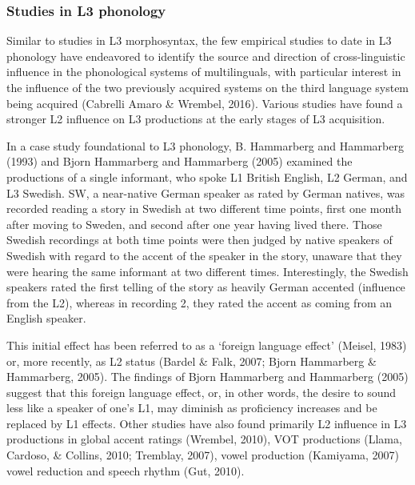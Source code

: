 \documentclass[
  man]{apa6}
\begin{document}
\hypertarget{studies-in-l3-phonology}{%
\subsubsection{Studies in L3 phonology}\label{studies-in-l3-phonology}}

Similar to studies in L3 morphosyntax, the few empirical studies to date in L3 phonology have endeavored to identify the source and direction of cross-linguistic influence in the phonological systems of multilinguals, with particular interest in the influence of the two previously acquired systems on the third language system being acquired (Cabrelli Amaro \& Wrembel, 2016).
Various studies have found a stronger L2 influence on L3 productions at the early stages of L3 acquisition.

In a case study foundational to L3 phonology, B. Hammarberg and Hammarberg (1993) and Bjorn Hammarberg and Hammarberg (2005) examined the productions of a single informant, who spoke L1 British English, L2 German, and L3 Swedish.
SW, a near-native German speaker as rated by German natives, was recorded reading a story in Swedish at two different time points, first one month after moving to Sweden, and second after one year having lived there.
Those Swedish recordings at both time points were then judged by native speakers of Swedish with regard to the accent of the speaker in the story, unaware that they were hearing the same informant at two different times.
Interestingly, the Swedish speakers rated the first telling of the story as heavily German accented (influence from the L2), whereas in recording 2, they rated the accent as coming from an English speaker.

This initial effect has been referred to as a `foreign language effect' (Meisel, 1983) or, more recently, as L2 status (Bardel \& Falk, 2007; Bjorn Hammarberg \& Hammarberg, 2005).
The findings of Bjorn Hammarberg and Hammarberg (2005) suggest that this foreign language effect, or, in other words, the desire to sound less like a speaker of one's L1, may diminish as proficiency increases and be replaced by L1 effects.
Other studies have also found primarily L2 influence in L3 productions in global accent ratings (Wrembel, 2010), VOT productions (Llama, Cardoso, \& Collins, 2010; Tremblay, 2007), vowel production (Kamiyama, 2007) vowel reduction and speech rhythm (Gut, 2010).
\end{document}
